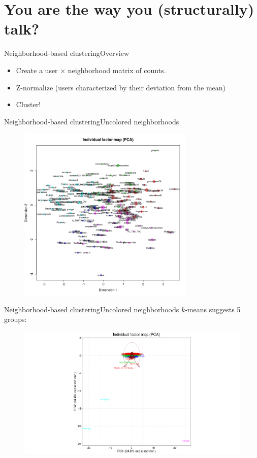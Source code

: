 \documentclass{beamer}
\begin{document}
\section{You are the way you (structurally) talk?}
\begin{frame}{Neighborhood-based clustering}{Overview}
\begin{itemize}
	\item Create a user $\times$ neighborhood matrix of counts.
	\item Z-normalize (users characterized by their deviation from the mean)
	\item Cluster!
\end{itemize}
\end{frame}


\begin{frame}{Neighborhood-based clustering}{Uncolored neighborhoods}
	\begin{figure}
		\centering
		\includegraphics[width=0.75\textwidth]{PCA_nocolor}
	\end{figure}	
\end{frame}

\begin{frame}{Neighborhood-based clustering}{Uncolored neighborhoods}
	$k$-means suggests 5 groups:
	\begin{figure}
		\centering
		\includegraphics[width=1\textwidth]{PCA}%
	\end{figure}	
\end{frame}
\end{document}
